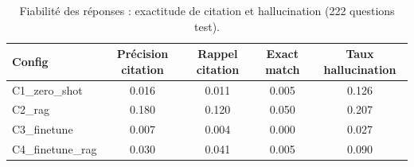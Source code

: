 \begin{table}[t]
\centering
\caption{Fiabilité des réponses : exactitude de citation et hallucination (222 questions test).}
\label{tab:citation-hallucination}
\begin{tabular}{lcccc}
\toprule
Config & Précision citation & Rappel citation & Exact match & Taux hallucination \\
\midrule
C1_zero_shot & 0.016 & 0.011 & 0.005 & 0.126 \\
C2_rag & 0.180 & 0.120 & 0.050 & 0.207 \\
C3_finetune & 0.007 & 0.004 & 0.000 & 0.027 \\
C4_finetune_rag & 0.030 & 0.041 & 0.005 & 0.090 \\
\bottomrule
\end{tabular}
\end{table}
